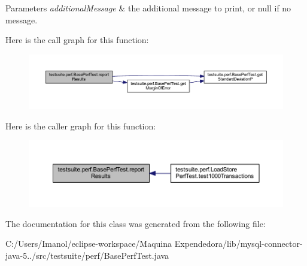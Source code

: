 \begin{DoxyParams}{Parameters}
{\em additional\+Message} & the additional message to print, or null if no message. \\
\hline
\end{DoxyParams}
Here is the call graph for this function\+:
\nopagebreak
\begin{figure}[H]
\begin{center}
\leavevmode
\includegraphics[width=350pt]{classtestsuite_1_1perf_1_1_base_perf_test_a88bddb3492e88ede49a0b70c63dc47b1_cgraph}
\end{center}
\end{figure}
Here is the caller graph for this function\+:
\nopagebreak
\begin{figure}[H]
\begin{center}
\leavevmode
\includegraphics[width=350pt]{classtestsuite_1_1perf_1_1_base_perf_test_a88bddb3492e88ede49a0b70c63dc47b1_icgraph}
\end{center}
\end{figure}


The documentation for this class was generated from the following file\+:\begin{DoxyCompactItemize}
\item 
C\+:/\+Users/\+Imanol/eclipse-\/workspace/\+Maquina Expendedora/lib/mysql-\/connector-\/java-\/5../src/testsuite/perf/Base\+Perf\+Test.\+java\end{DoxyCompactItemize}
